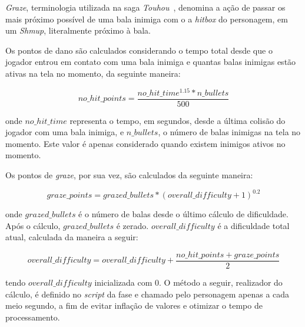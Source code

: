 \textit{Graze}, terminologia utilizada na saga \textit{Touhou}~\citep{Touhou}, denomina a ação de passar os mais próximo possível de uma bala inimiga com o a \textit{hitbox} do personagem, em um \textit{Shmup}, literalmente \textquotedbl{} próximo à bala.

Os pontos de dano são calculados considerando o tempo total desde que o jogador entrou em contato com uma bala inimiga e quantas balas inimigas estão ativas na tela no momento, da seguinte maneira:

$$
no\_hit\_points = \frac{no\_hit\_time^{1.15} * n\_bullets}{500}
$$

onde $no\_hit\_time$ representa o tempo, em segundos, desde a última colisão do jogador com uma bala inimiga, e $n\_bullets$, o número de balas inimigas na tela no momento. Este valor é apenas considerado quando existem inimigos ativos no momento.

Os pontos de \textit{graze}, por sua vez, são calculados da seguinte maneira:

$$
graze\_points = grazed\_bullets * (overall\_difficulty + 1)^{0.2}
$$

onde $grazed\_bullets$ é o número de balas \textquotedbl{} desde o último cálculo de dificuldade. Após o cálculo, $grazed\_bullets$ é zerado. $overall\_difficulty$ é a dificuldade total atual, calculada da maneira a seguir:

$$
overall\_difficulty = overall\_difficulty + \frac{no\_hit\_points + graze\_points}{2}
$$\label{overallDiffCalc}

tendo $overall\_difficulty$ inicializada com 0. O método a seguir, realizador do cálculo, é definido no \textit{script} da fase e chamado pelo personagem apenas a cada meio segundo, a fim de evitar inflação de valores e otimizar o tempo de processamento.

